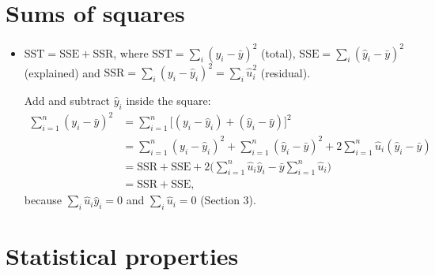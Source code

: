 \documentclass[11pt]{article}
\begin{document}
\section{Sums of squares}

\begin{itemize}
\item $\text{SST} = \text{SSE} + \text{SSR}$, where $\text{SST}=\sum_i (y_i - \bar{y})^2$ (total),
$\text{SSE}=\sum_i (\hat{y}_i - \bar{y})^2$ (explained) and $\text{SSR}=\sum_i (y_i - \hat{y}_i)^2 = \sum_i \hat u_i^2$ (residual).

Add and subtract $\hat y_i$ inside the square:
\begin{align*}
\sum_{i=1}^n (y_i - \bar{y})^2
&= \sum_{i=1}^n \big[(y_i - \hat{y}_i) + (\hat{y}_i - \bar{y})\big]^2 \\
&= \sum_{i=1}^n (y_i - \hat{y}_i)^2 + \sum_{i=1}^n (\hat{y}_i - \bar{y})^2 + 2\sum_{i=1}^n \hat u_i(\hat{y}_i - \bar{y}) \\
&= \text{SSR} + \text{SSE} + 2\Big(\sum_{i=1}^n \hat u_i \hat{y}_i - \bar{y}\sum_{i=1}^n \hat{u}_i\Big) \\
&= \text{SSR} + \text{SSE},
\end{align*}
because $\sum_i \hat u_i \hat y_i = 0$ and $\sum_i \hat u_i = 0$ (Section 3).
\end{itemize}
\clearpage

\section{Statistical properties}
\end{document}
